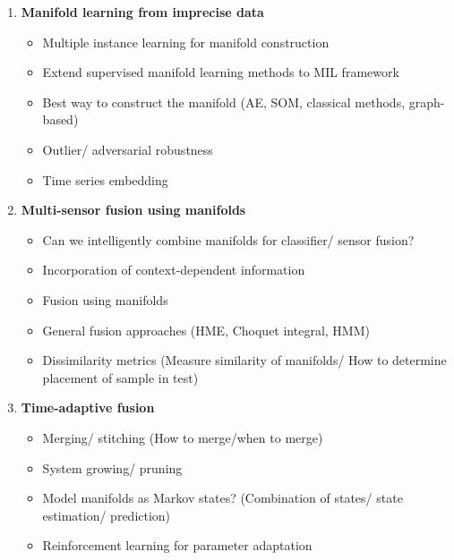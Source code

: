 \documentclass{article}[10 pt]
\begin{document}
\begin{enumerate}
\item \textbf{Manifold learning from imprecise data}
	\begin{itemize}
		\item Multiple instance learning for manifold construction
		\item Extend supervised manifold learning methods to MIL framework
		\item Best way to construct the manifold (AE, SOM, classical methods, graph-based)
		\item Outlier/ adversarial robustness
		\item Time series embedding
	\end{itemize}

\item \textbf{Multi-sensor fusion using manifolds}
\begin{itemize}
		\item Can we intelligently combine manifolds for classifier/ sensor fusion?
		\item Incorporation of context-dependent information
		\item Fusion using manifolds
		\item General fusion approaches (HME, Choquet integral, HMM)
		\item Dissimilarity metrics (Measure similarity of manifolds/ How to determine placement of sample in test)
	\end{itemize}

\item \textbf{Time-adaptive fusion}
\begin{itemize}
		\item Merging/ stitching (How to merge/when to merge)
		\item System growing/ pruning
		\item Model manifolds as Markov states? (Combination of states/ state estimation/ prediction)
		\item Reinforcement learning for parameter adaptation
	\end{itemize}

\end{enumerate}


\end{document}
